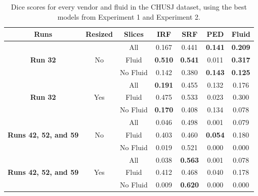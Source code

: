 \begin{table}[!ht]
	\caption{Dice scores for every vendor and fluid in the CHUSJ dataset, using the best models from Experiment 1 and Experiment 2.}
	\centering
	\begin{tabular}{|c|c|c|c|c|c|c|}
			\hline
			\textbf{Runs} &
			\textbf{Resized} &
			\textbf{Slices} &  
			\textbf{IRF} & 
			\textbf{SRF} & 
			\textbf{PED} & 
			\textbf{Fluid} \\
			
			\hline
			
			\multirow{3}{*}{\textbf{Run 32}} & \multirow{3}{*}{No} & All & 0.167 & 0.441 & \textbf{0.141} & \textbf{0.209} \\
			
			& & Fluid & \textbf{0.510} & \textbf{0.541} & 0.011 & \textbf{0.317} \\
			
			& & No Fluid & 0.142 & 0.380 & \textbf{0.143} & \textbf{0.125} \\
			
			\hline
			
			\multirow{3}{*}{\textbf{Run 32}} & \multirow{3}{*}{Yes} & 
			All & \textbf{0.191} & 0.455 & 0.132 & 0.176 \\
			
			& & 
			Fluid & 0.475 & 0.533 & 0.023 & 0.300 \\
			
			& & 
			No Fluid & \textbf{0.170} & 0.408 & 0.134 & 0.078 \\
			
			\hline
			\hline
			
			\multirow{3}{*}{\parbox{2cm}{\textbf{Runs 42, 52, and 59}}} & \multirow{3}{*}{No} & All & 0.046 & 0.498 & 0.001 & 0.079 \\
			
			& & 
			Fluid & 0.403 & 0.460 & \textbf{0.054} & 0.180 \\
			
			& & 
			No Fluid & 0.019 & 0.521 & 0.000 & 0.000\\
			
			\hline
			
			\multirow{3}{*}{\parbox{2cm}{\textbf{Runs 42, 52, and 59}}} & \multirow{3}{*}{Yes} & 
			All & 0.038 & \textbf{0.563} & 0.001 & 0.078 \\
			
			& & 
			Fluid & 0.412 & 0.468 & 0.040 & 0.178 \\
			
			& & 
			No Fluid & 0.009 & \textbf{0.620} & 0.000 & 0.000\\
			
			\hline
			
	\end{tabular}
	\label{tab:CHUSJSegmentationResults}
\end{table}


